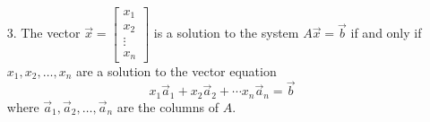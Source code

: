 \documentclass[pdf,9pt]{beamer}
\begin{document}
\begin{frame}[fragile]
\begin{theorem}[continued]
\begin{enumerate}
    \item[3.] The vector $\vec{x}=\left[ \begin{array}{c} x_1 \\ x_2 \\ \vdots \\ x_n \end{array}\right]$ is a solution
	to the system $A\vec{x}=\vec{b}$ if and only if $x_1, x_2, \ldots, x_n$ are a solution to the vector equation
	\[ x_1\vec{a}_1 + x_2\vec{a}_2 + \cdots x_n\vec{a}_n=\vec{b} \]
	where $\vec{a}_1, \vec{a}_2, \ldots, \vec{a}_n$ are the columns of $A$.
\end{enumerate}
\end{theorem}
\end{frame}

\end{document}
